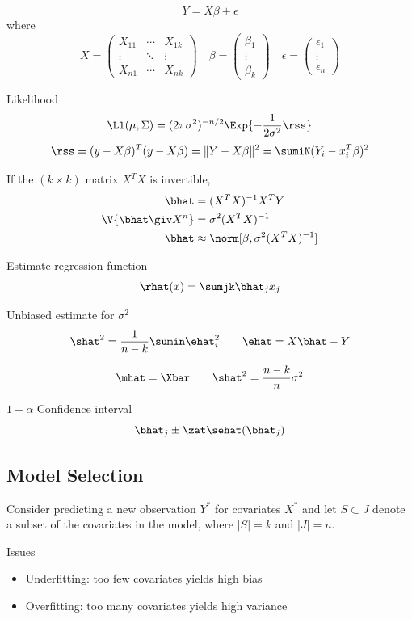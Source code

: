 \documentclass[landscape]{article}
\begin{document}
\begin{multicols*}{2}
\[Y = X\beta + \epsilon\]
where
\[X =
\begin{pmatrix} X_{11} & \cdots & X_{1k} \\ \vdots & \ddots & \vdots \\
  X_{n1} & \cdots & X_{nk}\end{pmatrix} \quad
\beta = \begin{pmatrix}\beta_1 \\ \vdots \\ \beta_k\end{pmatrix} \quad
\epsilon = \begin{pmatrix}\epsilon_1 \\ \vdots \\ \epsilon_n\end{pmatrix}\]

Likelihood
\[\Ll(\mu,\Sigma) = (2\pi\sigma^2)^{-n/2} \Exp{-\frac{1}{2\sigma^2}\rss}\]
\[\rss = (y-X\beta)^T(y-X\beta) = \|Y-X\beta\|^2 = \sumiN(Y_i-x_i^T\beta)^2\]

If the $(k \times k)$ matrix $X^TX$ is invertible,
\begin{align*}
  \bhat &= (X^TX)^{-1}X^TY \\
  \V{\bhat \giv X^n} &= \sigma^2(X^TX)^{-1} \\
  \bhat &\approx \norm[\beta, \sigma^2(X^TX)^{-1}]
\end{align*}

Estimate regression function
\[\rhat(x) = \sumjk\bhat_j x_j\]

Unbiased estimate for $\sigma^2$
\[\shat^2 = \frac{1}{n-k} \sumin \ehat_i^2 \qquad \ehat = X\bhat-Y\]

\mle
\[\mhat = \Xbar \qquad \shat^2 = \frac{n-k}{n}\sigma^2\]

$1-\alpha$ Confidence interval
\[\bhat_j \pm \zat\sehat(\bhat_j)\]

\subsection{Model Selection}

Consider predicting a new observation $Y^*$ for covariates $X^*$ and let $S
\subset J$ denote a subset of the covariates in the model, where $|S| = k$ and
$|J| = n$.

Issues
\begin{itemize}
  \item Underfitting: too few covariates yields high bias
  \item Overfitting: too many covariates yields high variance
\end{itemize}


\end{multicols*}
\end{document}
